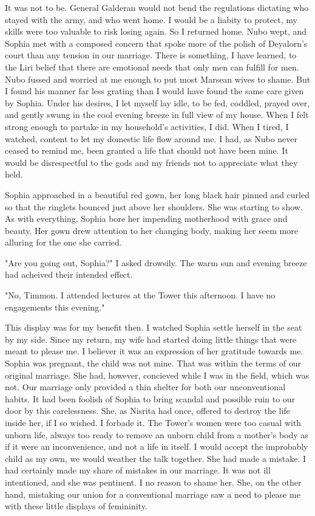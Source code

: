 \documentclass{article}
\begin{document}
It was not to be. General Galderan would not bend the regulations dictating who stayed with the army, and who went home. I would be a liabity to protect, my skills were too valuable to risk losing again. So I returned home. Nubo wept, and Sophia met with a composed concern that spoke more of the polish of Deyalorn's court than any tension in our marriage. There is something, I have learned, to the Liri belief that there are emotional needs that only men can fulfill for men. Nubo fussed and worried at me enough to put most Marsean wives to shame. But I found his manner far less grating than I would have found the same care given by Sophia. Under his desires, I let myself lay idle, to be fed, coddled, prayed over, and gently swung in the cool evening breeze in full view of my house. When I felt strong enough to partake in my household's activities, I did. When I tired, I watched, content to let my domestic life flow around me. I had, as Nubo never ceased to remind me, been granted a life that should not have been mine. It would be disrespectful to the gods and my friends not to appreciate what they held. 

Sophia approached in a beautiful red gown, her long black hair pinned and curled so that the ringlets bounced just above her shoulders. She was starting to show. As with everything, Sophia bore her impending motherhood with grace and beauty. Her gown drew attention to her changing body, making her seem more alluring for the one she carried.
 
"Are you going out, Sophia?" I asked drowsily. The warm sun and evening breeze had acheived their intended effect.

"No, Timmon. I attended lectures at the Tower this afternoon. I have no engagements this evening."

This display was for my benefit then. I watched Sophia settle herself in the seat by my side. Since my return, my wife had started doing little things that were meant to please me. I believer it was an expression of her gratitude towards me. Sophia was pregnant, the child was not mine. That was within the terms of our original marriage. She had, however, concieved while I was in the field, which was not. Our marriage only provided a thin shelter for both our unconventional habits. It had been foolish of Sophia to bring scandal and possible ruin to our door by this carelessness. She, as Nisrita had once, offered to destroy the life inside her, if I so wished. I forbade it. The Tower's women were too casual with unborn life, always too ready to remove an unborn child from a mother's body as if it were an inconvenience, and not a life in itself. I would accept the improbably child as my own, we would weather the talk together. She had made a mistake. I had certainly made my share of mistakes in our marriage. It was not ill intentioned, and she was pentinent. I no reason to shame her. She, on the other hand, mistaking our union for a conventional marriage saw a need to please me with these little displays of femininity.
\end{document}
